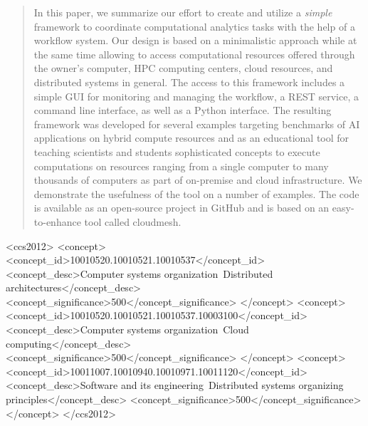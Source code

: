 \documentclass[sigplan,screen]{acmart}
\newcommand{\FILE}[1]{}
\begin{document}
\begin{abstract}

% 

 \FILE{abstract.tex}

 In this paper, we summarize our effort to create and utilize a {\em
 simple} framework to coordinate computational analytics tasks with
 the help of a workflow system. Our design is based on a minimalistic
 approach while at the same time allowing to access computational
 resources offered through the owner's computer, HPC computing
 centers, cloud resources, and distributed systems in general. The
 access to this framework includes a simple GUI for monitoring and
 managing the workflow, a REST service, a command line interface, as
 well as a Python interface. The resulting framework was developed for
 several examples targeting benchmarks of AI applications on hybrid
 compute resources and as an educational tool for teaching scientists
 and students sophisticated concepts to execute computations on
 resources ranging from a single computer to many thousands of
 computers as part of on-premise and cloud infrastructure. We
 demonstrate the usefulness of the tool on a number of examples. The
 code is available as an open-source project in GitHub and is based on
 an easy-to-enhance tool called cloudmesh.
 
\end{abstract}


% 


\begin{CCSXML}
<ccs2012>
<concept>
<concept_id>10010520.10010521.10010537</concept_id>
<concept_desc>Computer systems organization~Distributed architectures</concept_desc>
<concept_significance>500</concept_significance>
</concept>
<concept>
<concept_id>10010520.10010521.10010537.10003100</concept_id>
<concept_desc>Computer systems organization~Cloud computing</concept_desc>
<concept_significance>500</concept_significance>
</concept>
<concept>
<concept_id>10011007.10010940.10010971.10011120</concept_id>
<concept_desc>Software and its engineering~Distributed systems organizing principles</concept_desc>
<concept_significance>500</concept_significance>
</concept>
</ccs2012>
\end{CCSXML}

\end{document}
